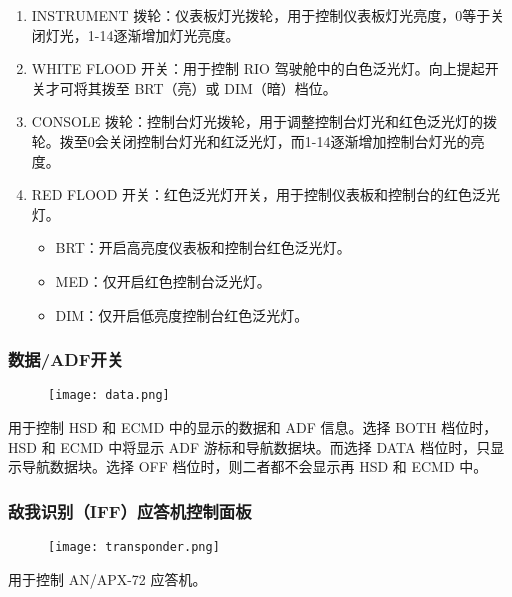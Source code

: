 \begin{enumerate}
  \item INSTRUMENT 拨轮：仪表板灯光拨轮，用于控制仪表板灯光亮度，0等于关闭灯光，1-14逐渐增加灯光亮度。
  \item WHITE FLOOD 开关：用于控制 RIO 驾驶舱中的白色泛光灯。向上提起开关才可将其拨至 BRT（亮）或 DIM（暗）档位。
  \item CONSOLE 拨轮：控制台灯光拨轮，用于调整控制台灯光和红色泛光灯的拨轮。拨至0会关闭控制台灯光和红泛光灯，而1-14逐渐增加控制台灯光的亮度。
  \item RED FLOOD 开关：红色泛光灯开关，用于控制仪表板和控制台的红色泛光灯。
  \begin{itemize}
    \item BRT：开启高亮度仪表板和控制台红色泛光灯。
    \item MED：仅开启红色控制台泛光灯。
    \item DIM：仅开启低亮度控制台红色泛光灯。
  \end{itemize}
\end{enumerate}

\subsubsection{数据/ADF开关}
\begin{figure}[htb]
  \center
  \texttt{[image: data.png]}
\end{figure}
用于控制 HSD 和 ECMD 中的显示的数据和 ADF 信息。选择 BOTH 档位时，HSD 和 ECMD 中将显示 ADF 游标和导航数据块。而选择 DATA 档位时，只显示导航数据块。选择 OFF 档位时，则二者都不会显示再 HSD 和 ECMD 中。

\subsubsection{敌我识别（IFF）应答机控制面板}
\begin{figure}[htb]
  \center
  \texttt{[image: transponder.png]}
\end{figure}
用于控制 AN/APX-72 应答机。


